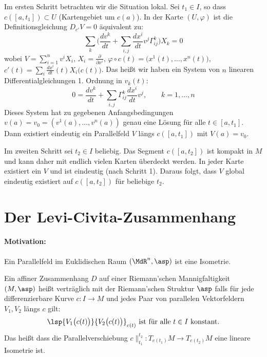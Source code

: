 \documentclass[a4paper,twoside,DIV15,BCOR12mm]{scrbook}
\begin{document}
\begin{beweis}
Im ersten Schritt betrachten wir die Situation lokal. Sei $t_1\in I$, so dass $c([a,t_1]) \subset U$ (Kartengebiet um $c(a)$). In der Karte $(U,\varphi)$ ist die Definitionsgleichung $D_{c'}V=0$ äquivalent zu:
\[
\sum_k \bigg(\frac{dv^k}{dt} + \sum_{i,j} \frac{dx^i}{dt}v^j \Gamma_{ij}^k \bigg) X_k = 0
\]
wobei $V = \sum_{i=1}^n v^i X_i$, $X_i = \frac\partial{\partial x^i}$, $\varphi \circ c(t) = \big(x^1(t),\ldots,x^n(t)\big)$, $c'(t) = \sum_i \frac{dx^i}{dt}(t)X_i\big(c(t)\big)$. Das heißt wir haben ein System von $n$ linearen Differentialgleichungen 1. Ordnung in $v_k(t)$:
\[
0 = \frac{dv^k}{dt} + \sum_{i,j} \Gamma_{ij}^k \frac{dx^i}{dt} v^j, \qquad k=1,\ldots,n
\]
Dieses System hat zu gegebenen Anfangsbedingungen $v(a)=v_0 = (v^1(a),\ldots,v^n(a))$ genau eine Lösung für alle $t\in [a,t_1]$. Dann existiert eindeutig ein Parallelfeld $V$ längs $c([a,t_1])$ mit $V(a)=v_0$.

Im zweiten Schritt sei $t_2\in I$ beliebig. Das Segment $c([a,t_2])$ ist kompakt in $M$ und kann daher mit endlich vielen Karten überdeckt werden. In jeder Karte existiert ein $V$ und ist eindeutig (nach Schritt 1). Daraus folgt, dass $V$ global eindeutig existiert auf $c([a,t_2])$ für beliebige $t_2$.
\end{beweis}

\section{Der Levi-Civita-Zusammenhang}

\paragraph{Motivation:} Ein Parallelfeld im Euklidischen Raum $(\MdR^n,\asp)$ ist eine Isometrie. 

\begin{definition}
Ein affiner Zusammenhang $D$ auf einer Riemann’schen Mannigfaltigkeit $(M,\asp)$ heißt verträglich mit der Riemann’schen Struktur $\asp$ falls für jede differenzierbare Kurve $c:I\to M$ und jedes Paar von parallelen Vektorfeldern $V_1,V_2$ längs $c$ gilt:
\[
\lsp {V_1\big(c(t)\big)}{V_2\big(c(t)\big)}_{c(t)} \text{ ist für alle $t\in I$ konstant.}
\]
Das heißt dass die Parallelverschiebung $c\|_{t_1}^{t_2}: T_{c(t_1)}M \to T_{c(t_2)}M$ eine lineare Isometrie ist.
\end{definition}
\end{document}
